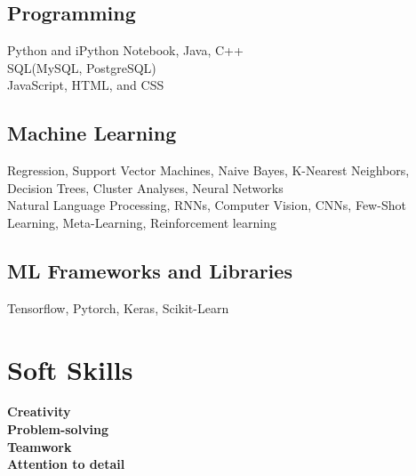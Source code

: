 \documentclass[letterpaper]{resume} %
\begin{document}
\begin{minipage}[t]{0.42\textwidth}
\subsection{Programming}
Python and iPython Notebook, Java, C++ \\
SQL(MySQL, PostgreSQL) \\
JavaScript, HTML, and CSS \\

\sectionspace %

\subsection{Machine Learning}
Regression, Support Vector Machines, Naive Bayes, K-Nearest Neighbors, Decision Trees, Cluster Analyses, Neural Networks \\
Natural Language Processing, RNNs, Computer Vision, CNNs, Few-Shot Learning, Meta-Learning, Reinforcement learning \\

\sectionspace %

\subsection{ML Frameworks and Libraries}
Tensorflow, Pytorch, Keras, Scikit-Learn \\


\sectionspace %

\section{Soft Skills}
{\bf Creativity} \\
{\bf Problem-solving} \\
{\bf Teamwork} \\
{\bf Attention to detail} \\


\sectionspace %


\end{minipage}
\end{document}
